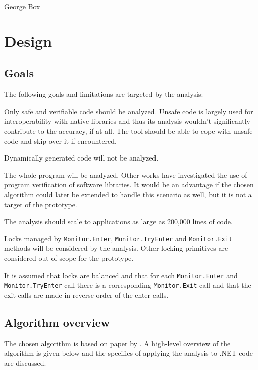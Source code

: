 %
         {George Box}
\chapter{Design}

\section{Goals}

The following goals and limitations are targeted by the analysis:
\begin{itemize*}
\item Only safe and verifiable code should be analyzed. Unsafe code is largely used for interoperability with native libraries and thus its analysis wouldn't significantly contribute to the accuracy, if at all. The tool should be able to cope with unsafe code and skip over it if encountered.
\item Dynamically generated code will not be analyzed.
\item The whole program will be analyzed. Other works have investigated the use of program verification of software libraries. It would be an advantage if the chosen algorithm could later be extended to handle this scenario as well, but it is not a target of the prototype.
\item The analysis should scale to applications as large as 200,000 lines of code.
\item Locks managed by \texttt{Monitor.Enter}, \texttt{Monitor.TryEnter} and \texttt{Monitor.Exit} methods will be considered by the analysis. Other locking primitives are considered out of scope for the prototype.
\item It is assumed that locks are balanced and that for each \texttt{Monitor.Enter} and \texttt{Monitor.TryEnter} call there is a corresponding \texttt{Monitor.Exit} call and that the exit calls are made in reverse order of the enter calls. 
\end{itemize*}

\section{Algorithm overview}

The chosen algorithm is based on paper by \citet{Williams2005}. A high-level overview of the algorithm is given below and the specifics of applying the analysis to .NET code are discussed.

